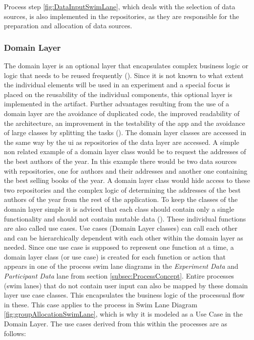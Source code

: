 
Process step \ref{fig:DataInputSwimLane}, which deals with the selection of data sources, is also implemented in the repositories, as they are responsible for the preparation and allocation of data sources.

\subsubsection{Domain Layer}

The domain layer is an optional layer that encapsulates complex business logic or logic that needs to be reused frequently (\cite{Google.2023}). Since it is not known to what extent the individual elements will be used in an experiment and a special focus is placed on the reusability of the individual components, this optional layer is implemented in the artifact. Further advantages resulting from the use of a domain layer are the avoidance of duplicated code, the improved readability of the architecture, an improvement in the testability of the app and the avoidance of large classes by splitting the tasks (\cite{Google.2023}). The domain layer classes are accessed in the same way by the \ac{ui} as repositories of the data layer are accessed. A simple non related example of a domain layer class would be to request the addresses of the best authors of the year. In this example there would be two data sources with repositories, one for authors and their addresses and another one containing the best selling books of the year. A domain layer class would hide access to these two repositories and the complex logic of determining the addresses of the best authors of the year from the rest of the application. To keep the classes of the domain layer simple it is adviced that each class should contain only a single functionality and should not contain mutable data (\cite{Google.2023}). These individual functions are also called use cases. Use cases (Domain Layer classes) can call each other and can be hierarchically dependent with each other within the domain layer as needed. Since one use case is supposed to represent one function at a time, a domain layer class (or use case) is created for each function or action that appears in one of the process swim lane diagrams in the \textit{Experiment Data} and \textit{Participant Data} lane from section \ref{subsec:ProcessConcept}. Entire processes (swim lanes) that do not contain user input can also be mapped by these domain layer use case classes. This encapsulates the business logic of the processual flow in these. This case applies to the process in Swim Lane Diagram \ref{fig:groupAllocationSwimLane}, which is why it is modeled as a Use Case in the Domain Layer. The use cases derived from this within the processes are as follows:

